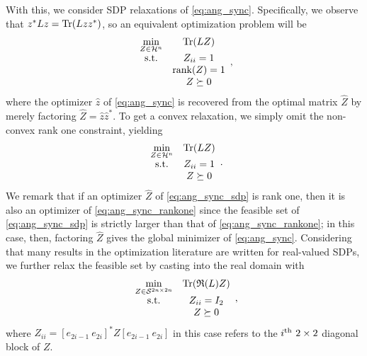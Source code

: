 With this, we consider SDP relaxations of \eqref{eq:ang_sync}.  Specifically, we observe that $z^* L z = \operatorname{Tr}(L z z^*)$, so an equivalent optimization problem will be \begin{equation} \begin{array}{cc} \min\limits_{Z \in \mathcal{H}^n} & \operatorname{Tr}(L Z) \\ \text{s.t.} & Z_{ii} = 1 \\ & \operatorname{rank}(Z) = 1 \\ & Z \succeq 0 \end{array}, \label{eq:ang_sync_rankone} \end{equation} where the optimizer $\hat{z}$ of \eqref{eq:ang_sync} is recovered from the optimal matrix $\hat{Z}$ by merely factoring $\hat{Z} = \hat{z} \hat{z}^*$.  To get a convex relaxation, we simply omit the non-convex rank one constraint, yielding \begin{equation} \begin{array}{cc} \min\limits_{Z \in \mathcal{H}^n} & \operatorname{Tr}(L Z) \\ \text{s.t.} & Z_{ii} = 1 \\ & Z \succeq 0 \end{array}. \label{eq:ang_sync_sdp} \end{equation}  We remark that if an optimizer $\hat{Z}$ of \eqref{eq:ang_sync_sdp} is rank one, then it is also an optimizer of \eqref{eq:ang_sync_rankone} since the feasible set of \eqref{eq:ang_sync_sdp} is strictly larger than that of \eqref{eq:ang_sync_rankone}; in this case, then, factoring $\hat{Z}$ gives the global minimizer of \eqref{eq:ang_sync}.  Considering that many results in the optimization literature are written for real-valued SDPs, we further relax the feasible set by casting into the real domain with \begin{equation} \begin{array}{cc} \min\limits_{Z \in \mathcal{S}^{2n \times 2n}} & \operatorname{Tr}(\mathfrak{R}(L) Z) \\ \text{s.t.} & Z_{ii} = I_2 \\ & Z \succeq 0 \end{array}, \label{eq:ang_sync_real} \end{equation} where $Z_{ii} = [e_{2i - 1} \ e_{2i}]^* Z [e_{2i - 1} \ e_{2i}]$ in this case refers to the $i^{\text{th}} \ 2 \times 2$ diagonal block of $Z$.


